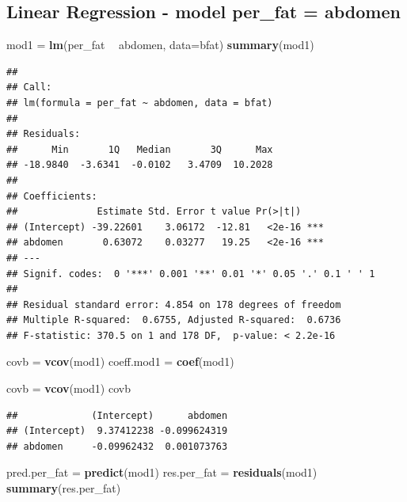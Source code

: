 \documentclass[]{article}
\newenvironment{Shaded}{\begin{snugshade}}{\end{snugshade}}
\newcommand{\KeywordTok}[1]{\textcolor[rgb]{0.13,0.29,0.53}{\textbf{#1}}}
\newcommand{\DataTypeTok}[1]{\textcolor[rgb]{0.13,0.29,0.53}{#1}}
\newcommand{\StringTok}[1]{\textcolor[rgb]{0.31,0.60,0.02}{#1}}
\newcommand{\OperatorTok}[1]{\textcolor[rgb]{0.81,0.36,0.00}{\textbf{#1}}}
\newcommand{\NormalTok}[1]{#1}
\begin{document}
\subsection{Linear Regression - model per\_fat =
abdomen}\label{linear-regression---model-per_fat-abdomen}

\begin{Shaded}
\begin{Highlighting}[]
\NormalTok{mod1 =}\StringTok{ }\KeywordTok{lm}\NormalTok{(per_fat }\OperatorTok{~}\StringTok{ }\NormalTok{abdomen, }\DataTypeTok{data=}\NormalTok{bfat)}
\KeywordTok{summary}\NormalTok{(mod1)}
\end{Highlighting}
\end{Shaded}

\begin{verbatim}
## 
## Call:
## lm(formula = per_fat ~ abdomen, data = bfat)
## 
## Residuals:
##      Min       1Q   Median       3Q      Max 
## -18.9840  -3.6341  -0.0102   3.4709  10.2028 
## 
## Coefficients:
##              Estimate Std. Error t value Pr(>|t|)    
## (Intercept) -39.22601    3.06172  -12.81   <2e-16 ***
## abdomen       0.63072    0.03277   19.25   <2e-16 ***
## ---
## Signif. codes:  0 '***' 0.001 '**' 0.01 '*' 0.05 '.' 0.1 ' ' 1
## 
## Residual standard error: 4.854 on 178 degrees of freedom
## Multiple R-squared:  0.6755, Adjusted R-squared:  0.6736 
## F-statistic: 370.5 on 1 and 178 DF,  p-value: < 2.2e-16
\end{verbatim}

\begin{Shaded}
\begin{Highlighting}[]
\NormalTok{covb =}\StringTok{ }\KeywordTok{vcov}\NormalTok{(mod1)}
\NormalTok{coeff.mod1 =}\StringTok{ }\KeywordTok{coef}\NormalTok{(mod1)}

\NormalTok{covb =}\StringTok{ }\KeywordTok{vcov}\NormalTok{(mod1)}
\NormalTok{covb}
\end{Highlighting}
\end{Shaded}

\begin{verbatim}
##             (Intercept)      abdomen
## (Intercept)  9.37412238 -0.099624319
## abdomen     -0.09962432  0.001073763
\end{verbatim}

\begin{Shaded}
\begin{Highlighting}[]
\NormalTok{pred.per_fat =}\StringTok{ }\KeywordTok{predict}\NormalTok{(mod1)}
\NormalTok{res.per_fat =}\StringTok{ }\KeywordTok{residuals}\NormalTok{(mod1)}
\KeywordTok{summary}\NormalTok{(res.per_fat)}
\end{Highlighting}
\end{Shaded}
\end{document}
